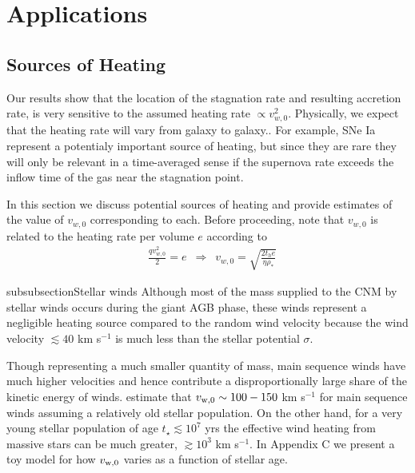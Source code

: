 \documentclass[usenatbib,fleqn]{mn2e}
\newcommand{\rhostar}{\rho_*}
\newcommand{\vwO}{v_{w,0}}
\begin{document}
\section{Applications}
\label{sec:applications}
\subsection{Sources of Heating}
\label{sec:heating}

Our results show that the location of the stagnation rate and resulting accretion rate, is very sensitive to the assumed heating rate $\propto v_{w,0}^{2}$.  Physically, we expect that the heating rate will vary from galaxy to galaxy.. For example, SNe Ia represent a potentialy important source of heating, but since they are rare they will only be relevant in a time-averaged sense if the supernova rate exceeds the inflow time of the gas near the stagnation point.  

In this section we discuss potential sources of heating and provide estimates of the value of $\vwO$ corresponding to each.  Before proceeding, note that $\vwO$ is related to the heating rate per volume $e$ according to 
\begin{align}
  &\frac{q \vwO^2}{2}=e \,\,\,\Rightarrow\,\,\,\vwO = \sqrt{\frac{2 t_h e}{\eta \rhostar}}
  \label{eq:vw_eff}
\end{align}

subsubsection{Stellar winds} Although most of the mass supplied to the CNM by stellar winds occurs during the giant AGB phase, these winds represent a negligible heating source compared to the random wind velocity because the wind velocity $\lesssim 40$ km s$^{-1}$ is much less than the stellar potential $\sigma$.  

Though representing a much smaller quantity of mass, main sequence winds have much higher velocities and hence contribute a disproportionally large share of the kinetic energy of winds.  \citep{NaimanSoares-Furtado+:2013a} estimate that $v_{\rm w,0} \sim 100-150$ km s$^{-1}$ for main sequence winds assuming a relatively old stellar population.  On the other hand, for a very young stellar population of age $t_{\star} \lesssim 10^{7}$ yrs the effective wind heating from massive stars can be much greater, $\gtrsim 10^{3}$ km s$^{-1}$.  In Appendix C we present a toy model for how $v_{\rm w,0}$ varies as a function of stellar age.
\end{document}

